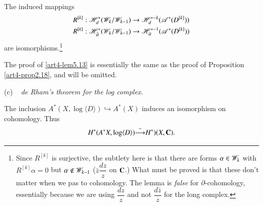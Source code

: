 \begin{lemma}\label{art4-lem5.13}
The induced mappings 
\begin{align*}
& R^{[k]}: \mathscr{H}^\ast_d (\mathscr{W}_k / \mathscr{W}_{k-1}) \to \mathscr{H}^{\ast-k}_d (\mathscr{A}^\ast (D^{[k]}))\\
& R^{[k]} : \mathscr{H}^\ast_{\bar{\partial}} (\mathscr{W}_k / \mathscr{W}_{k-1}) \to \mathscr{H}^{\ast-1}_{\partial} (\mathscr{A}^\ast (D^{[k]}))
\end{align*}
are isomorphisms.\footnote[22]{Since $R^{[k]}$ is surjective, the subtlety here is that there are forms $\alpha \in \mathscr{W}_k$ with $R^{[k]}\alpha =0$ but $\alpha \not\in \mathscr{W}_{k-1}$ (\eg $\bar{z} \dfrac{dz}{z}$ on $\mathbf{C}$.) What must be proved is that these don't matter when we pas to cohomology. The lemma is \textit{false} for $\partial$-cohomology, essentially because we are using $\dfrac{dz}{z}$ and not $\dfrac{d\bar{z}}{z}$ for the long complex.}
\end{lemma}

The proof of \eqref{art4-lem5.13} is essentially the same as the proof of Proposition  \eqref{art4-prop2.18}, and will be omitted.

(c) ~ \textit{de Rham's theorem for the log complex.}

\begin{proposition}\label{art4-prop5.14}
The inclusion $A^\ast (X, \log \langle D \rangle) \hookrightarrow A^\ast (X)$ induces an isomorphism on cohomology. Thus
$$
H^\ast (A^\ast X, \log \langle D \rangle) {\displaystyle{\mathop{\longrightarrow}^{\sim}}} H^\ast )(X, \mathbf{C}).
$$
\end{proposition}

